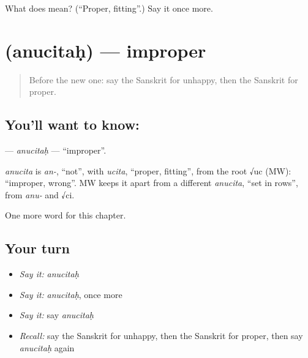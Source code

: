 \begin{tcolorbox}[breakable,colback=teal!4,colframe=teal!35!black,title={Before you move on}]
What does  mean? (\textquotedblleft{}Proper, fitting\textquotedblright{}.) Say it once more.
\end{tcolorbox}
\section[\texorpdfstring{\sk{अनुचितः} (anucitaḥ)}{अनुचितः (anucitaḥ)}]{ (anucitaḥ) — improper}

\label{lesson:SA-C244-anucitah}



\begin{quote}
Before the new one: say the Sanskrit for unhappy, then the Sanskrit for proper.
\end{quote}

\subsection*{You'll want to know: }
\textbf{} — \emph{anucitaḥ} — \textquotedblleft{}improper\textquotedblright{}.

\begin{cousinweb}
\emph{anucita} is \emph{an-}, \textquotedblleft{}not\textquotedblright{}, with \emph{ucita}, \textquotedblleft{}proper, fitting\textquotedblright{}, from the root √uc (MW): \textquotedblleft{}improper, wrong\textquotedblright{}. MW keeps it apart from a different \emph{anucita}, \textquotedblleft{}set in rows\textquotedblright{}, from \emph{anu-} and √ci.
\end{cousinweb}

\begin{grammarlens}[title={What you've built}]
One more word for this chapter.
\end{grammarlens}

\subsection*{Your turn}
\begin{itemize}
\raggedright
  \item \emph{Say it:} \emph{anucitaḥ}
  \item \emph{Say it:} \emph{anucitaḥ}, once more
  \item \emph{Say it:} say \emph{anucitaḥ}
  \item \emph{Recall:} say the Sanskrit for unhappy, then the Sanskrit for proper, then say \emph{anucitaḥ} again
\end{itemize}

